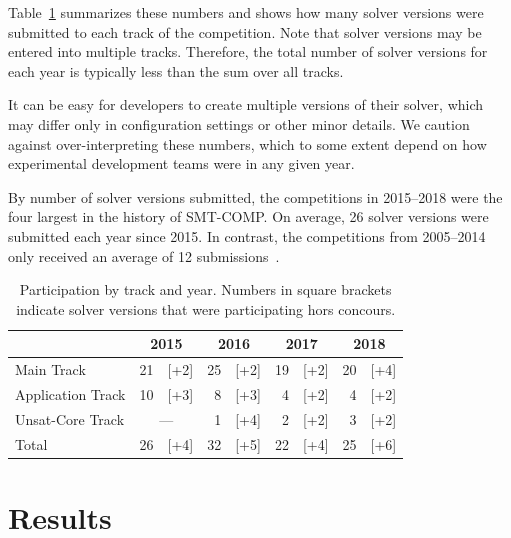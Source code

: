 \documentclass[dvipsnames,table,twoside,11pt]{article}
\newcommand{\maintrack}{Main Track\xspace}
\newcommand{\apptrack}{Application Track\xspace}
\newcommand{\ucoretrack}{Unsat-Core Track\xspace}
\begin{document}
Table~\ref{table:participation-by-track} summarizes these numbers and
shows how many solver versions were submitted to each track of the
competition.  Note that solver versions may be entered into multiple
tracks.  Therefore, the total number of solver versions for each year
is typically less than the sum over all tracks.

It can be easy for developers to create multiple versions of their
solver, which may differ only in configuration settings or other minor
details.  We caution against over-interpreting these numbers, which to
some extent depend on how experimental development teams were in any
given year.

By number of solver versions submitted, the competitions in 2015--2018
were the four largest in the history of SMT-COMP.  On average, 26
solver versions were submitted each year since 2015.  In contrast, the
competitions from 2005--2014 only received an average of 12
submissions~\cite{CDW14}.

\begin{table}
  \caption{Participation by track and year.  Numbers in square
    brackets indicate solver versions that were participating hors
    concours.}
  \label{table:participation-by-track}
  \centering
  \begin{tabular}{lr@{\,\,}rr@{\,\,}rr@{\,\,}rr@{\,\,}r}
    \toprule
                      & \multicolumn{2}{c}{2015} & \multicolumn{2}{c}{2016} & \multicolumn{2}{c}{2017} & \multicolumn{2}{c}{2018} \\
    \midrule
    \maintrack   & 21 &               [+2] & 25 & [+2] & 19 & [+2] & 20 & [+4] \\
    \apptrack    & 10 &               [+3] &  8 & [+3] &  4 & [+2] &  4 & [+2] \\
    \ucoretrack  & \multicolumn{2}{c}{---} &  1 & [+4] &  2 & [+2] &  3 & [+2] \\
    \midrule
    Total             & 26 &               [+4] & 32 & [+5] & 22 & [+4] & 25 & [+6] \\
    \bottomrule
  \end{tabular}
\end{table}


\section{Results}
\label{sec:results}
\end{document}

